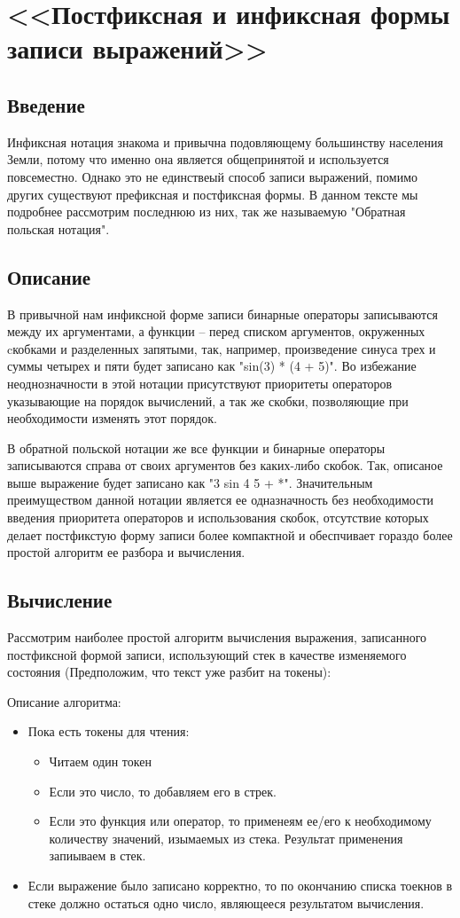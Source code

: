 \section{<<Постфиксная и инфиксная формы записи выражений>>}
\subsection{Введение}
Инфиксная нотация знакома и привычна подовляющему большинству населения 
Земли, потому что именно она является общепринятой и используется повсеместно.
Однако это не единствеый способ записи выражений, помимо других существуют 
префиксная и постфиксная формы. В данном тексте мы подробнее рассмотрим 
последнюю из них, так же называемую "Обратная польская нотация".

\subsection{Описание}
В привычной нам инфиксной форме записи бинарные операторы записываются между 
их аргументами, а функции -- перед списком аргументов, окруженных 
cкобками и разделенных запятыми, так, например, произведение синуса трех и суммы 
четырех и пяти будет записано как "sin(3) * (4 + 5)". Во избежание неоднозначности 
в этой нотации присутствуют приоритеты операторов указывающие на порядок вычислений,
а так же скобки, позволяющие при необходимости изменять этот порядок.

В обратной польской нотации же все функции и бинарные операторы записываются 
справа от своих аргументов без каких-либо скобок. Так, описаное выше выражение 
будет записано как "3 sin 4 5 + *". Значительным преимуществом данной нотации 
является ее одназначность без необходимости введения приоритета операторов и
использования скобок, отсутствие которых делает постфикстую форму записи более 
компактной и обеспчивает гораздо более простой алгоритм ее разбора и вычисления.

\subsection{Вычисление} 
Рассмотрим наиболее простой алгоритм вычисления выражения, записанного 
постфиксной формой записи, использующий стек в качестве изменяемого состояния
(Предположим, что текст уже разбит на токены):

Описание алгоритма:
\begin{itemize}
  \item Пока есть токены для чтения:
    \begin{itemize}
      \item Читаем один токен
      \item Если это число, то добавляем его в стрек.
      \item Если это функция или оператор, то применеям ее/его к необходимому 
        количеству значений, изымаемых из стека. Результат применения запиываем в стек.
    \end{itemize}
  \item Если выражение было записано корректно, то по окончанию списка тоекнов 
    в стеке должно остаться одно число, являющееся результатом вычисления.
\end{itemize}

